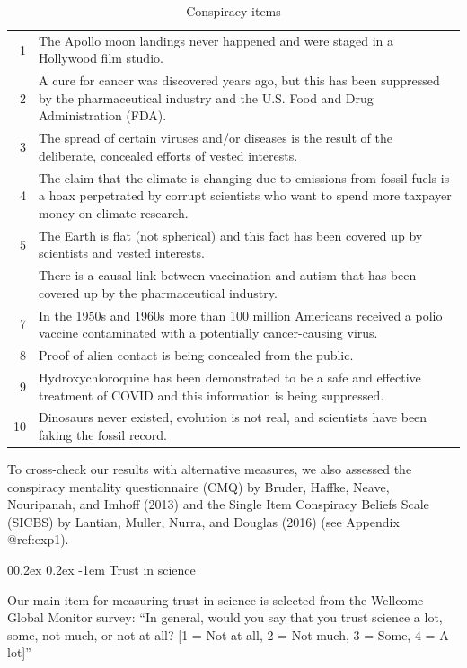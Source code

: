 \documentclass[
  doc,floatsintext]{apa6}
\makeatletter
\let\oldparagraph\paragraph
\renewcommand{\paragraph}[1]{\oldparagraph{#1}\mbox{}}
\renewcommand{\paragraph}{\@startsection{paragraph}{4}{\parindent}%
  {0\baselineskip \@plus 0.2ex \@minus 0.2ex}%
  {-1em}%
  {\normalfont\normalsize\bfseries\itshape\typesectitle}}
\makeatother
\begin{document}
\begin{longtable}[t]{>{}r>{\raggedright\arraybackslash}p{30em}}
\caption{\label{tab:conspiracy}Conspiracy items}\\
\toprule
1 & The Apollo moon landings never happened and were staged in a Hollywood film studio.\\
2 & A cure for cancer was discovered years ago, but this has been suppressed by the pharmaceutical industry and the U.S. Food and Drug Administration (FDA).\\
3 & The spread of certain viruses and/or diseases is the result of the deliberate, concealed efforts of vested interests.\\
4 & The claim that the climate is changing due to emissions from fossil fuels is a hoax perpetrated by corrupt scientists who want to spend more taxpayer money on climate research.\\
5 & The Earth is flat (not spherical) and this fact has been covered up by scientists and vested interests.\\
\addlinespace
6 & There is a causal link between vaccination and autism that has been covered up by the pharmaceutical industry.\\
7 & In the 1950s and 1960s more than 100 million Americans received a polio vaccine contaminated with a potentially cancer-causing virus.\\
8 & Proof of alien contact is being concealed from the public.\\
9 & Hydroxychloroquine has been demonstrated to be a safe and effective treatment of COVID and this information is being suppressed.\\
10 & Dinosaurs never existed, evolution is not real, and scientists have been faking the fossil record.\\
\bottomrule
\end{longtable}

To cross-check our results with alternative measures, we also assessed the conspiracy mentality questionnaire (CMQ) by Bruder, Haffke, Neave, Nouripanah, and Imhoff (2013) and the Single Item Conspiracy Beliefs Scale (SICBS) by Lantian, Muller, Nurra, and Douglas (2016) (see Appendix @ref:exp1).

\hypertarget{trust-in-science}{%
\paragraph{Trust in science}\label{trust-in-science}}

Our main item for measuring trust in science is selected from the Wellcome Global Monitor survey: ``In general, would you say that you trust science a lot, some, not much, or not at all? {[}1 = Not at all, 2 = Not much, 3 = Some, 4 = A lot{]}''
\end{document}

